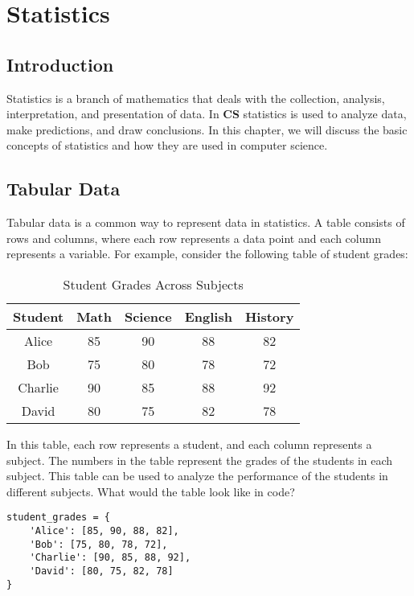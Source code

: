 \chapter{Statistics}\label{chap:statistics}

\section{Introduction}

Statistics is a branch of mathematics that deals with the collection, analysis, interpretation, and presentation of data. In \textbf{CS} statistics is used to analyze data, make predictions, and draw conclusions. In this chapter, we will discuss the basic concepts of statistics and how they are used in computer science.

\section{Tabular Data}

Tabular data is a common way to represent data in statistics. A table consists of rows and columns, where each row represents a data point and each column represents a variable. For example, consider the following table of student grades:

\begin{table}[H]
\centering
\caption{Student Grades Across Subjects}
\begin{tabular}{|c|c|c|c|c|}
\hline
\textbf{Student} & \textbf{Math} & \textbf{Science} & \textbf{English} & \textbf{History} \\
\hline
Alice    & 85  & 90  & 88  & 82 \\
Bob      & 75  & 80  & 78  & 72 \\
Charlie  & 90  & 85  & 88  & 92 \\
David    & 80  & 75  & 82  & 78 \\
\hline
\end{tabular}\label{tab:student-grades}
\end{table}

In this table, each row represents a student, and each column represents a subject. The numbers in the table represent the grades of the students in each subject. This table can be used to analyze the performance of the students in different subjects. What would the table look like in code?

\begin{lstlisting}[caption={Student Grades Across Subjects in Python}, label={lst:student-grades}]
student_grades = {
    'Alice': [85, 90, 88, 82],
    'Bob': [75, 80, 78, 72],
    'Charlie': [90, 85, 88, 92],
    'David': [80, 75, 82, 78]
}
\end{lstlisting}


